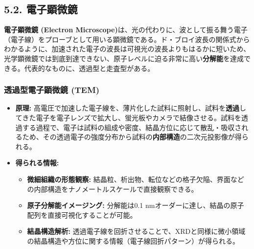 \documentclass[11pt,a4paper]{ltjsarticle}
\begin{document}
\subsection*{5.2. 電子顕微鏡}

\textbf{電子顕微鏡 (Electron Microscope)}は、光の代わりに、波として振る舞う電子（電子線）をプローブとして用いる顕微鏡である。ド・ブロイ波長の関係式からわかるように、加速された電子の波長は可視光の波長よりもはるかに短いため、光学顕微鏡では到底到達できない、原子レベルに迫る非常に高い\textbf{分解能}を達成できる。代表的なものに、透過型と走査型がある。

\subsubsection*{透過型電子顕微鏡 (TEM)}
\begin{itemize}
\item \textbf{原理:} 高電圧で加速した電子線を、薄片化した試料に照射し、試料を\textbf{透過}してきた電子を電子レンズで拡大し、蛍光板やカメラで結像させる。試料を透過する過程で、電子は試料の組成や密度、結晶方位に応じて散乱・吸収されるため、その透過電子の強度分布から試料の\textbf{内部構造}の二次元投影像が得られる。
\item \textbf{得られる情報:}
\begin{itemize}
\item \textbf{微細組織の形態観察:} 結晶粒、析出物、転位などの格子欠陥、界面などの内部構造をナノメートルスケールで直接観察できる。
\item \textbf{原子分解能イメージング:} 分解能は0.1 nmオーダーに達し、結晶の原子配列を直接可視化することが可能。
\item \textbf{結晶構造解析:} 透過電子線を回折させることで、XRDと同様に微小領域の結晶構造や方位に関する情報（電子線回折パターン）が得られる。
\end{itemize}
\end{itemize}
\end{document}

